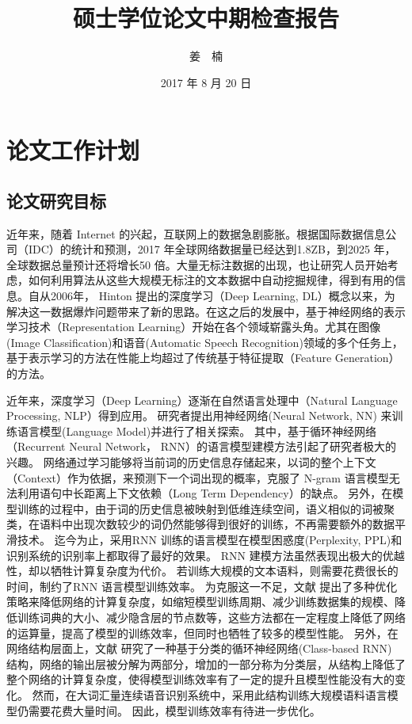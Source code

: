\documentclass[twoside,UTF8,AutoFakeBold]{buaathesis}
\title{硕士学位论文中期检查报告}
\author{姜~~楠}
\date{2017 年 8 月 20 日}
\begin{document}
\maketitle

\newpage
\newpage
{}
\tableofcontents
\newpage

\begin{table}
\vspace{20pt}
\vspace{20pt}
\end{table}
\section{论文工作计划}
\subsection{论文研究目标}
近年来，随着 Internet 的兴起，互联网上的数据急剧膨胀。根据国际数据信息公司（IDC）的统计和预测，2017 年全球网络数据量已经达到1.8ZB，到2025 年，全球数据总量预计还将增长50 倍。大量无标注数据的出现，也让研究人员开始考虑，如何利用算法从这些大规模无标注的文本数据中自动挖掘规律，得到有用的信息。自从2006年， Hinton 提出的深度学习（Deep Learning, DL）概念以来\cite{hinton2006reducing}，为解决这一数据爆炸问题带来了新的思路。在这之后的发展中，基于神经网络的表示学习技术（Representation Learning）开始在各个领域崭露头角。尤其在图像(Image Classification)和语音(Automatic Speech Recognition)领域的多个任务上，基于表示学习的方法在性能上均超过了传统基于特征提取（Feature Generation）的方法。

近年来，深度学习（Deep Learning）逐渐在自然语言处理中（Natural Language Processing, NLP）得到应用。 研究者提出用神经网络(Neural Network, NN) 来训练语言模型(Language Model)并进行了相关探索\cite{DBLP:conf/nips/BengioDV00}。 其中，基于循环神经网络（Recurrent Neural Network， RNN）的语言模型建模方法引起了研究者极大的兴趣\cite{DBLP:conf/interspeech/MikolovKBCK10}。 网络通过学习能够将当前词的历史信息存储起来，以词的整个上下文（Context）作为依据，来预测下一个词出现的概率，克服了 N-gram 语言模型无法利用语句中长距离上下文依赖（Long Term Dependency）的缺点。 另外，在模型训练的过程中，由于词的历史信息被映射到低维连续空间，语义相似的词被聚类，在语料中出现次数较少的词仍然能够得到很好的训练，不再需要额外的数据平滑技术。 迄今为止，采用RNN 训练的语言模型在模型困惑度(Perplexity, PPL)和识别系统的识别率上都取得了最好的效果。 RNN 建模方法虽然表现出极大的优越性，却以牺牲计算复杂度为代价。 若训练大规模的文本语料，则需要花费很长的时间，制约了RNN 语言模型训练效率。 为克服这一不足，文献 \cite{DBLP:conf/icassp/MikolovKBCK11} 提出了多种优化策略来降低网络的计算复杂度，如缩短模型训练周期、减少训练数据集的规模、降低训练词典的大小、减少隐含层的节点数等，这些方法都在一定程度上降低了网络的运算量，提高了模型的训练效率，但同时也牺牲了较多的模型性能。 另外，在网络结构层面上，文献\cite{DBLP:journals/coling/BrownPdLM92} 研究了一种基于分类的循环神经网络(Class-based RNN) 结构，网络的输出层被分解为两部分，增加的一部分称为分类层，从结构上降低了整个网络的计算复杂度，使得模型训练效率有了一定的提升且模型性能没有大的变化。 然而，在大词汇量连续语音识别系统中，采用此结构训练大规模语料语言模型仍需要花费大量时间。 因此，模型训练效率有待进一步优化。
\end{document}

